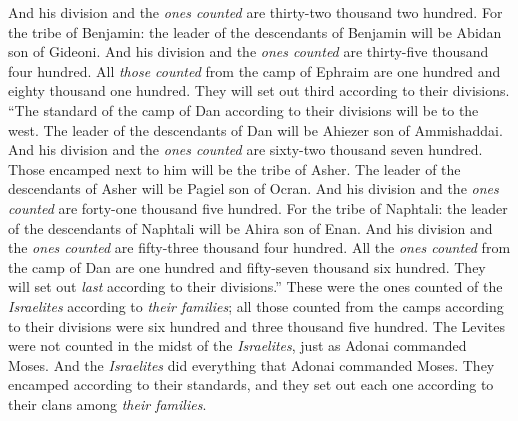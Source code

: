 \begin{biblechapter}
\verse And his division and the \textit{ones counted} are thirty-two thousand two hundred.
\verse For the tribe of Benjamin: the leader of the descendants of Benjamin will be Abidan son of Gideoni.
\verse And his division and the \textit{ones counted} are thirty-five thousand four hundred.
\verse All \textit{those counted} from the camp of Ephraim are one hundred and eighty thousand one hundred. They will set out third according to their divisions.
\verse “The standard of the camp of Dan according to their divisions will be to the west. The leader of the descendants of Dan will be Ahiezer son of Ammishaddai.
\verse And his division and the \textit{ones counted} are sixty-two thousand seven hundred.
\verse Those encamped next to him will be the tribe of Asher. The leader of the descendants of Asher will be Pagiel son of Ocran.
\verse And his division and the \textit{ones counted} are forty-one thousand five hundred.
\verse For the tribe of Naphtali: the leader of the descendants of Naphtali will be Ahira son of Enan.
\verse And his division and the \textit{ones counted} are fifty-three thousand four hundred.
\verse All the \textit{ones counted} from the camp of Dan are one hundred and fifty-seven thousand six hundred. They will set out \textit{last} according to their divisions.”
\verse These were the ones counted of the \textit{Israelites} according to \textit{their families}; all those counted from the camps according to their divisions were six hundred and three thousand five hundred.
\verse The Levites were not counted in the midst of the \textit{Israelites}, just as Adonai commanded Moses.
\verse And the \textit{Israelites} did everything that Adonai commanded Moses. They encamped according to their standards, and they set out each one according to their clans among \textit{their families}.
\end{biblechapter}

